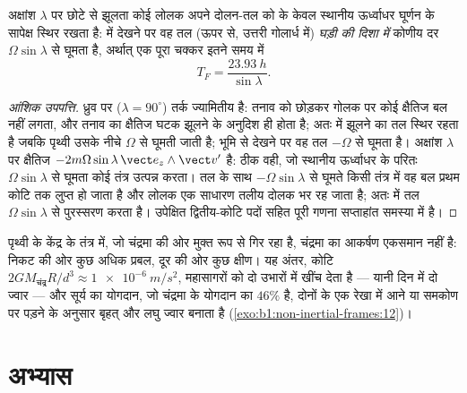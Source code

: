 \begin{proposition}[फूको का लोलक]\label{prop:b1:non-inertial-frames:foucault}
अक्षांश $\lambda$ पर छोटे  से झूलता कोई लोलक अपने दोलन-तल को  के केवल स्थानीय ऊर्ध्वाधर घूर्णन के सापेक्ष स्थिर रखता है:  में देखने पर वह तल (ऊपर से, उत्तरी गोलार्ध में) \emph{घड़ी की दिशा
में} कोणीय दर $\Omega\sin\lambda$ से घूमता है, अर्थात् एक पूरा चक्कर इतने
समय में
\[
T_F = \frac{\qty{23.93}{h}}{\sin\lambda} .
\]
\end{proposition}

\begin{proof}[आंशिक उपपत्ति]
ध्रुव पर ($\lambda = 90^\circ$) तर्क ज्यामितीय है: तनाव को छोड़कर गोलक पर
कोई क्षैतिज बल नहीं लगता, और तनाव का क्षैतिज घटक झूलने के अनुदिश ही होता
है; अतः  में झूलने का तल स्थिर रहता है जबकि पृथ्वी उसके
नीचे $\Omega$ से घूमती जाती है; भूमि से देखने पर वह तल
$-\Omega$ से घूमता है। अक्षांश $\lambda$ पर क्षैतिज 
$-2m\Omega\sin\lambda\,\vect e_z\wedge\vect v'$ है: ठीक वही, जो स्थानीय
ऊर्ध्वाधर के परितः $\Omega\sin\lambda$ से घूमता कोई तंत्र उत्पन्न करता। तल
के साथ $-\Omega\sin\lambda$ से घूमते किसी तंत्र में वह बल प्रथम कोटि तक
लुप्त हो जाता है और लोलक एक साधारण तलीय दोलक भर रह जाता है; अतः  में तल $\Omega\sin\lambda$ से पुरस्सरण करता है। उपेक्षित
द्वितीय-कोटि पदों सहित पूरी गणना सप्ताहांत समस्या में है।
\end{proof}

\begin{remark}[ज्वार-भाटा, दो पंक्तियों में]\label{rem:b1:non-inertial-frames:tides}
पृथ्वी के केंद्र के तंत्र में, जो चंद्रमा की ओर मुक्त रूप से गिर रहा है,
चंद्रमा का आकर्षण एकसमान नहीं है: निकट की ओर कुछ अधिक प्रबल, दूर की ओर कुछ
क्षीण। यह अंतर, कोटि $2GM_{\text{चंद्र}}R/d^3 \approx \qty{1e-6}{m/s^2}$,
महासागरों को दो उभारों में खींच देता है ---
यानी दिन में दो ज्वार --- और सूर्य का योगदान, जो चंद्रमा के योगदान का
$46\%$ है, दोनों के एक रेखा में आने या समकोण पर पड़ने के अनुसार बृहत् और
लघु ज्वार बनाता है (\cref{exo:b1:non-inertial-frames:12})।
\end{remark}

\section{अभ्यास}

